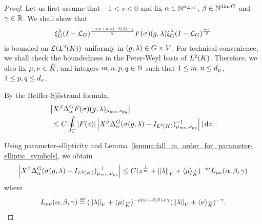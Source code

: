 \begin{proof}
    Let us first assume that $-1 < s < 0$
    and fix $\alpha \in \mathbb{N}^{n_{\Delta, G}}$, $\beta \in \mathbb{N}^{\dim G}$ and $\gamma \in \mathbb{R}$.
    We shall show that
    \begin{align*}
        \xi^{\lambda}_{G} (I - {\mathcal{L}_{G}})^\frac{-sm + \rho \left|{\alpha}\right| - \delta \left|{\beta}\right| + \gamma}{2}
        F(\sigma)(g, \lambda)
        \xi^{\lambda}_{G} (I - {\mathcal{L}_{G}})^\frac{-\gamma}{2}
    \end{align*}
    is bounded on ${\mathcal{L} ({L^{2} (K)})}$ uniformly in $(g, \lambda) \in G \times V$.
    For technical convenience,
    we shall check the boundedness in the Peter-Weyl basis of ${L^{2} (K)}$.
    Therefore, we also fix $\mu, \nu \in {\widehat{K}}$,
    and integers $m, n, p, q \in \mathbb{N}$ such that
    $1 \leq m, n \leq {d_{\mu}}$, $1 \leq p, q \leq {d_{\nu}}$.

    By the Helffer-Sj\"ostrand formula,
    \begin{align*}
        &\abs {%
            \LeftDifferentialOperator \beta \DifferenceOperator \alpha
            F(\sigma)(g, \lambda)_{\mu_{m n}, \nu_{p q}}
        }\\
        &\ \leq C \oint_{\Gamma} \abs {F(z)}
        \abs {%
            \LeftDifferentialOperator \beta \DifferenceOperator \alpha
            (\sigma(g, \lambda) - \Id {\Lebesgue 2 \CompactGroup})^{-1}_{\mu_{m n}, \nu_{p q}}
        } \abs {\dd z}.
    \end{align*}

    Using parameter-ellipticity and Lemma~\ref{lemma:fall_in_order_for_parameter-elliptic_symbols},
    we obtain
    \begin{align*}
        \abs {%
            \LeftDifferentialOperator \beta \DifferenceOperator \alpha
            (\sigma(g, \lambda) - \Id {\Lebesgue 2 \CompactGroup})^{-1}_{\mu_{m n}, \nu_{p q}}
        }
        \leq
        C
        (z^{\frac 1 m} + \norm [\VectorSpace] \lambda + \JapaneseBracket \CompactGroup \mu)^{-m}
        L_{\mu \nu}(\alpha, \beta, \gamma)
    \end{align*}
    where
    \begin{align*}
        L_{\mu \nu}(\alpha, \beta, \gamma) \defeq
        (\norm [\VectorSpace] \lambda + \JapaneseBracket \CompactGroup \mu)^{-\rho \abs \alpha + \delta \abs \beta + \gamma}
        (\norm [\VectorSpace] \lambda + \JapaneseBracket \CompactGroup \nu)^{-\gamma}.
    \end{align*}


\end{proof}
